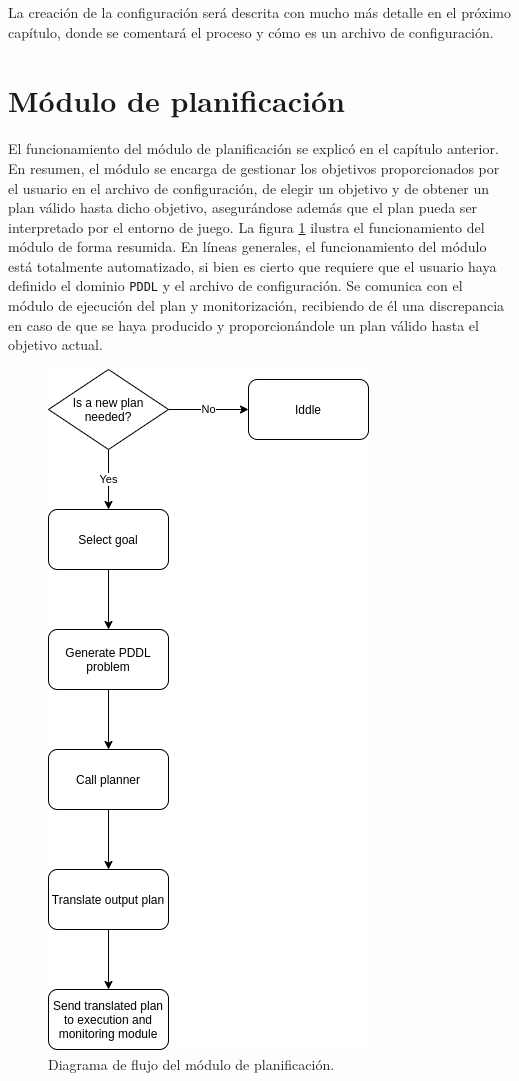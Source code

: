La creación de la configuración será descrita con mucho más detalle en el próximo capítulo,
donde se comentará el proceso y cómo es un archivo de configuración.

\section{Módulo de planificación}

El funcionamiento del módulo de planificación se explicó en el capítulo anterior. En resumen, el
módulo se encarga de gestionar los objetivos proporcionados por el usuario en el archivo de
configuración, de elegir un objetivo y de obtener un plan válido hasta dicho objetivo, asegurándose
además que el plan pueda ser interpretado por el entorno de juego. La figura \ref{fig:flux-planning}
ilustra el funcionamiento del módulo de forma resumida. En líneas generales, el funcionamiento del módulo está
totalmente automatizado, si bien es cierto que requiere que el usuario haya definido el dominio \texttt{PDDL}
y el archivo de configuración. Se comunica con el módulo de ejecución del plan y monitorización,
recibiendo de él una discrepancia en caso de que se haya producido y proporcionándole un plan válido
hasta el objetivo actual.

\begin{figure}[H]
    \centering
    \includegraphics[scale=0.45]{img/CH05/flux_planning.png}
    \caption{Diagrama de flujo del módulo de planificación.}
    \label{fig:flux-planning}
\end{figure}

